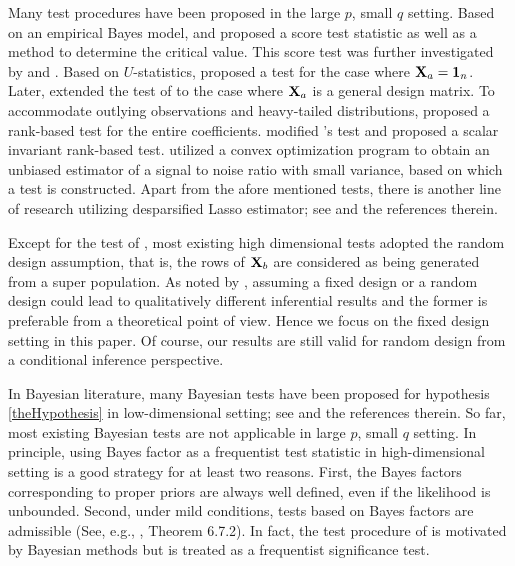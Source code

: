 \documentclass[11pt]{article}
\theoremstyle{plain}
\theoremstyle{definition}
\theoremstyle{remark}
\begin{document}
Many test procedures have been proposed in the large $p$, small $q$ setting.
Based on an empirical Bayes model, \cite{Goeman2006} and \cite{Goeman2011} proposed a score test statistic as well as a method to determine the critical value.
This score test was further investigated by \cite{Lan2014Testing} and \cite{Lan2016a}.
Based on $U$-statistics, \cite{Zhong2011Tests} proposed a test for the case where $\mathbf{X}_a=\mathbf 1_n$.
Later, \cite{Wang2015} extended the test of \cite{Zhong2011Tests} to the case where $\mathbf{X}_a$ is a general design matrix.
To accommodate outlying observations and heavy-tailed distributions, \cite{Feng2013}
proposed a rank-based test for the entire coefficients.
\cite{Xu2016a} modified \cite{Feng2013}'s test and proposed a scalar invariant rank-based test.
\cite{Janson2016} utilized a convex optimization program to obtain an unbiased estimator of a signal to noise ratio with small variance, based on which a test is constructed.
Apart from the afore mentioned tests,
there is another line of research utilizing desparsified Lasso estimator; see \cite{Dezeure2017} and the references therein.

Except for the test of \cite{Goeman2006}, most existing high dimensional tests adopted the random design assumption, that is, the rows of $\mathbf{X}_b$ are considered as being generated from a super population.
As noted by \cite{Lei2018}, assuming a fixed design or a random design could lead to qualitatively different inferential results and the former is preferable from a theoretical point of view.
Hence we focus on the fixed design setting in this paper.
Of course, our results are still valid for random design from a conditional inference perspective.




In Bayesian literature, many Bayesian tests have been proposed for hypothesis \eqref{theHypothesis} in low-dimensional setting; see \cite{javier2006Obj,Goddard2016,zhou2018On} and the references therein.
So far, most existing Bayesian tests are not applicable in large $p$, small $q$ setting.
In principle,
using Bayes factor as a frequentist test statistic in high-dimensional setting is a good strategy for at least two reasons.
First, the Bayes factors corresponding to proper priors are always well defined, even if the likelihood is unbounded.
Second, under mild conditions, tests based on Bayes factors are admissible (See, e.g., \cite{Lehmann}, Theorem 6.7.2).
In fact, the test procedure of \cite{Goeman2006} is motivated by Bayesian methods but is treated as a frequentist significance test.
\end{document}
